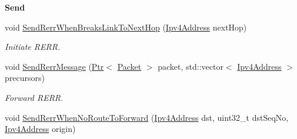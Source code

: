 \begin{Indent}{\bf Send}
\begin{DoxyCompactItemize}
void \hyperlink{classns3_1_1aodv_1_1RoutingProtocol_ae2ab3a83b71210d82c458e5e680c1351}{Send\+Rerr\+When\+Breaks\+Link\+To\+Next\+Hop} (\hyperlink{classns3_1_1Ipv4Address}{Ipv4\+Address} next\+Hop)
\begin{DoxyCompactList}\small\item\em Initiate R\+E\+RR. \end{DoxyCompactList}\item 
void \hyperlink{classns3_1_1aodv_1_1RoutingProtocol_abc216040fe7b7ac100ea7bf2ce9a0bdb}{Send\+Rerr\+Message} (\hyperlink{classns3_1_1Ptr}{Ptr}$<$ \hyperlink{classns3_1_1Packet}{Packet} $>$ packet, std\+::vector$<$ \hyperlink{classns3_1_1Ipv4Address}{Ipv4\+Address} $>$ precursors)
\begin{DoxyCompactList}\small\item\em Forward R\+E\+RR. \end{DoxyCompactList}\item 
void \hyperlink{classns3_1_1aodv_1_1RoutingProtocol_aa8b4c8c3811348aa19e76218523796af}{Send\+Rerr\+When\+No\+Route\+To\+Forward} (\hyperlink{classns3_1_1Ipv4Address}{Ipv4\+Address} dst, uint32\+\_\+t dst\+Seq\+No, \hyperlink{classns3_1_1Ipv4Address}{Ipv4\+Address} origin)
\end{DoxyCompactItemize}
\end{Indent}
